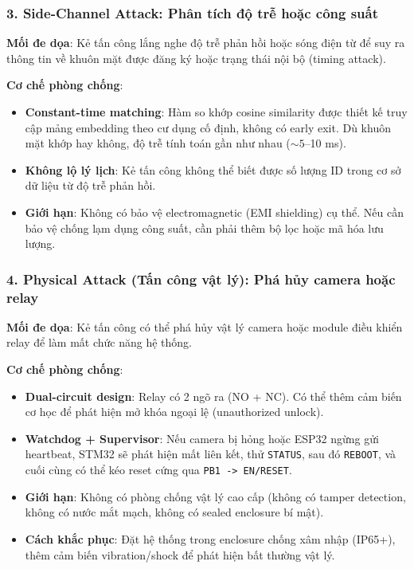 \subsubsection{3. Side-Channel Attack: Phân tích độ trễ hoặc công suất}

\textbf{Mối đe dọa}: Kẻ tấn công lắng nghe độ trễ phản hồi hoặc sóng điện từ để suy ra thông tin về khuôn mặt được đăng ký hoặc trạng thái nội bộ (timing attack).

\textbf{Cơ chế phòng chống}:
\begin{itemize}
  \item \textbf{Constant-time matching}: Hàm so khớp cosine similarity được thiết kế truy cập mảng embedding theo cư dụng cố định, không có early exit. Dù khuôn mặt khớp hay không, độ trễ tính toán gần như nhau ($\sim 5$--10 ms).
  \item \textbf{Không lộ lý lịch}: Kẻ tấn công không thể biết được số lượng ID trong cơ sở dữ liệu từ độ trễ phản hồi.
  \item \textbf{Giới hạn}: Không có bảo vệ electromagnetic (EMI shielding) cụ thể. Nếu cần bảo vệ chống lạm dụng công suất, cần phải thêm bộ lọc hoặc mã hóa lưu lượng.
\end{itemize}

\subsubsection{4. Physical Attack (Tấn công vật lý): Phá hủy camera hoặc relay}

\textbf{Mối đe dọa}: Kẻ tấn công có thể phá hủy vật lý camera hoặc module điều khiển relay để làm mất chức năng hệ thống.

\textbf{Cơ chế phòng chống}:
\begin{itemize}
  \item \textbf{Dual-circuit design}: Relay có 2 ngõ ra (NO + NC). Có thể thêm cảm biến cơ học để phát hiện mở khóa ngoại lệ (unauthorized unlock).
  \item \textbf{Watchdog + Supervisor}: Nếu camera bị hỏng hoặc ESP32 ngừng gửi heartbeat, STM32 sẽ phát hiện mất liên kết, thử \texttt{STATUS}, sau đó \texttt{REBOOT}, và cuối cùng có thể kéo reset cứng qua \texttt{PB1 -> EN/RESET}.
  \item \textbf{Giới hạn}: Không có phòng chống vật lý cao cấp (không có tamper detection, không có nước mắt mạch, không có sealed enclosure bí mật).
  \item \textbf{Cách khắc phục}: Đặt hệ thống trong enclosure chống xâm nhập (IP65+), thêm cảm biến vibration/shock để phát hiện bất thường vật lý.
\end{itemize}

